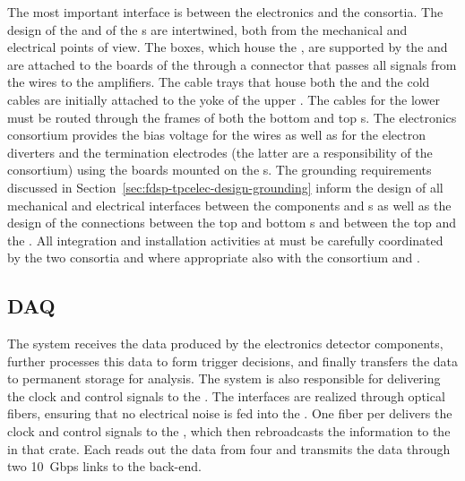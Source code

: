 The most important interface is between the  electronics
and the  consortia. The design of the 
and of the s are intertwined, both from the
mechanical and electrical points of view. The 
boxes, which house the , are supported by the 
and are attached to the  boards of the 
through a connector that passes all signals from the wires to
the  amplifiers. The cable trays that house both the
 and the  cold cables are initially
attached to the yoke of the upper . The 
cables for the lower  must be routed through the 
frames of both the bottom and top s. The  electronics
consortium provides the bias voltage for the 
wires as well as for the electron diverters and the  termination electrodes (the latter are a responsibility of
the  consortium) using the  boards mounted
on the s. The grounding requirements discussed in
Section~\ref{sec:fdsp-tpcelec-design-grounding} inform the
design of all mechanical and electrical interfaces between
the  components and s as well as the
design of the connections between the top and bottom s
and between the top  and the . All 
integration and installation activities at 
must be carefully coordinated by the two consortia and
where appropriate also with the  consortium 
and .

\subsection{DAQ}
\label{sec:fdsp-tpcelec-interfaces-daq}

The  system receives the data produced by the
 electronics detector components, further processes this data to
form trigger decisions, and finally transfers the data to 
permanent storage for analysis. The 
 system is also responsible for delivering the clock and control
signals to the . The interfaces are realized 
through optical fibers, ensuring that no electrical noise is fed into
the . One fiber per  delivers the
clock and control signals to the , which then
rebroadcasts the information to the  in that 
crate. Each  reads out the data from four 
and transmits the data through two \SI{10}{Gbps} links to the  back-end.

